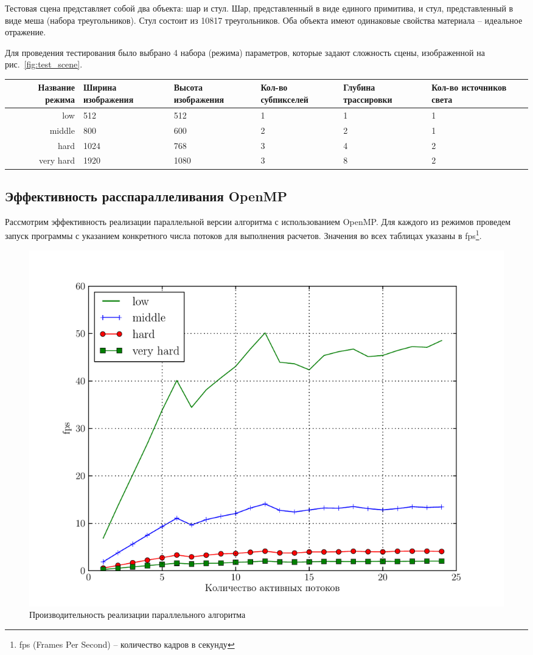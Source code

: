 \documentclass[12pt, a4paper, utf8]{article}
\begin{document}
Тестовая сцена представляет собой два объекта: шар и стул. Шар, представленный в виде единого примитива, и стул, представленный в виде меша (набора треугольников). Стул состоит из 10817 треугольников. Оба объекта имеют одинаковые свойства материала -- идеальное отражение. 

Для проведения тестирования было выбрано 4 набора (режима) параметров, которые задают сложность сцены, изображенной на рис.~\ref{fig:test_scene}.

\noindent
\begin{tabular}{|r|p{2cm}|p{2cm}|p{2cm}|p{2cm}|p{2cm}|}
\hline
Название режима & Ширина изображения &  Высота изображения  & Кол-во субпикселей & Глубина трассировки & Кол-во источников света \\  \hline
low       & 512  & 512  & 1 & 1 & 1 \\ \hline
middle    & 800  & 600  & 2 & 2 & 1 \\ \hline
hard      & 1024 & 768  & 3 & 4 & 2 \\ \hline
very hard & 1920 & 1080 & 3 & 8 & 2 \\ \hline
\end{tabular}

\subsection{Эффективность расспараллеливания OpenMP}

Рассмотрим эффективность реализации параллельной версии алгоритма с использованием OpenMP. Для каждого из режимов проведем запуск программы с указанием конкретного числа потоков для выполнения расчетов. Значения во всех таблицах указаны в fps\footnote{fps  (Frames Per Second) -- количество кадров в секунду}.



\begin{figure}[H]
\centering
\includegraphics[width=\textwidth]{perf/table_perf.pdf}
\caption{Производительность реализации параллельного алгоритма}\label{fig:perf_parallel_alg}
\end{figure}
\end{document}
